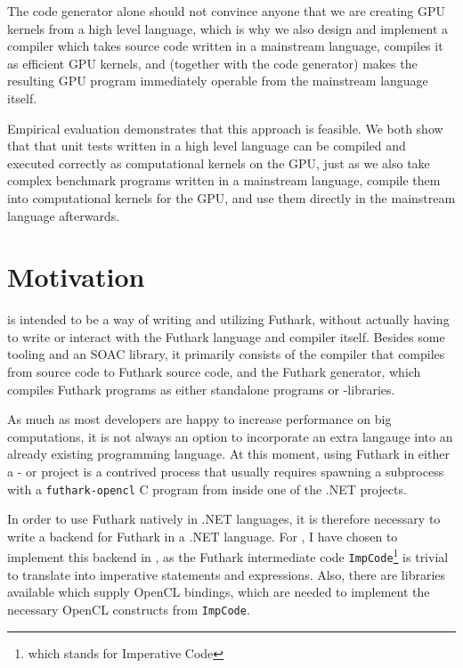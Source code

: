 The code generator alone should not convince anyone that we are creating GPU
kernels from a high level language, which is why we also design and implement a
compiler which takes source code written in a mainstream language, compiles it
as efficient GPU kernels, and (together with the code generator) makes the
resulting GPU program immediately operable from the mainstream language itself.  

Empirical evaluation demonstrates that this approach is feasible.
We both show that that unit tests written in a high level language can be compiled and executed
correctly as computational kernels on the GPU, just as we also take complex
benchmark programs written in a mainstream language, compile them into
computational kernels for the GPU, and use them directly in the mainstream
language afterwards.











\section*{Motivation}
\fshark{} is intended to be a way of writing and utilizing Futhark, without
actually having to write or interact with the Futhark language and compiler
itself. Besides some tooling and an \fsharp{} SOAC library, it primarily consists of the \fshark{} compiler that compiles from
\fsharp{} source code to Futhark source code, and the Futhark \csharp{}
generator, which compiles Futhark programs as either standalone \csharp{}
programs or -libraries.

As much as most developers are happy to increase performance on big
computations, it is not always an option to incorporate an extra langauge into
an already existing programming language. At this moment, using Futhark in
either a \csharp{}- or \fsharp{} project is a contrived process that usually
requires spawning a subprocess with a \texttt{futhark-opencl} C program from inside one of the .NET
projects.

In order to use Futhark natively in .NET languages, it is therefore
necessary to write a backend for Futhark in a .NET language.
For \fshark{}, I have chosen to implement this backend in \csharp{}, as the Futhark intermediate
code \texttt{ImpCode}\footnote{which stands for Imperative Code} is trivial to
translate into imperative \csharp{} statements and expressions.
Also, there are \csharp{} libraries available which supply OpenCL bindings, which are
needed to implement the necessary OpenCL constructs from \texttt{ImpCode}.

